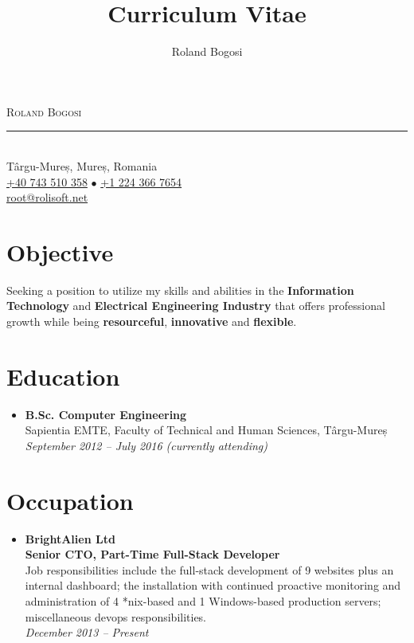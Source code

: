 \documentclass[11pt,a4paper]{article}
\author{Roland Bogosi}
\title{Curriculum Vitae}
\begin{document}
	\begin{center}
	\textsc{\Huge Roland Bogosi}\\
	\vspace{-2mm}
	\rule{300pt\color{LightGray}}{0.5px}\\
	\vspace{0.5mm}
	{\lsstyle\color{DarkGray} Târgu-Mureș, Mureș, Romania\\
	\href{tel:+40743510358}{\color{DarkGray} +40 743 510 358} {\color{LightGray}$\bullet$} \href{tel:+12243667654}{\color{DarkGray} +1 224 366 7654}\\
	\href{mailto:root@rolisoft.net}{\color{DarkGray} root@rolisoft.net}}
	\end{center}

\section*{Objective}
	Seeking a position to utilize my skills and abilities in the \textbf{Information Technology} and \textbf{Electrical Engineering Industry} that offers professional growth while being \textbf{resourceful}, \textbf{innovative} and \textbf{flexible}.

\section*{Education}
	\begin{itemize}
	\item	{\large\textbf{B.Sc. Computer Engineering}}\\
			Sapientia EMTE, Faculty of Technical and Human Sciences, Târgu-Mureș\\
			\textit{September 2012 – July 2016 (currently attending)}
	\end{itemize}

\section*{Occupation}
	\begin{itemize}
	\item	{\large\textbf{BrightAlien Ltd}}\\
			\textbf{Senior CTO, Part-Time Full-Stack Developer}\\
			Job responsibilities include the full-stack development of 9 websites plus an internal dashboard; the installation with continued proactive monitoring and administration of 4 *nix-based and 1 Windows-based production servers; miscellaneous devops responsibilities.\\
			\textit{December 2013 – Present}
	\end{itemize}
\end{document}
